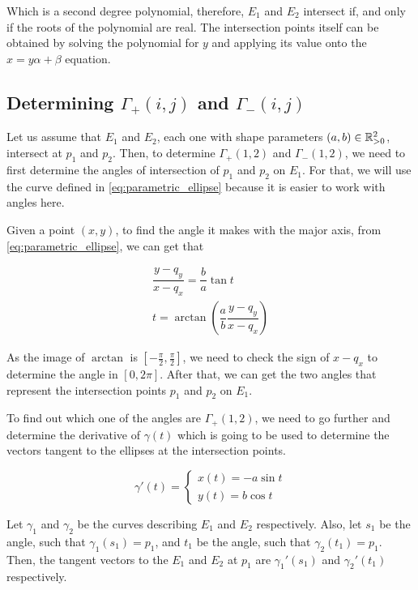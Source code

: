 Which is a second degree polynomial, therefore, $E_1$ and $E_2$ intersect if, and only if the roots of the polynomial are real. The intersection points itself can be obtained by solving the polynomial for $y$ and applying its value onto the $x=y\alpha + \beta$ equation.

\subsection{Determining $\Gamma_+(i,j)$ and $\Gamma_-(i,j)$}

Let us assume that $E_1$ and $E_2$, each one with shape parameters $(a,b) \in \mathbb{R}^2_{>0}$, intersect at $p_1$ and $p_2$. Then, to determine $\Gamma_+(1,2)$ and $\Gamma_-(1,2)$, we need to first determine the angles of intersection of $p_1$ and $p_2$ on $E_1$. For that, we will use the curve defined in \autoref{eq:parametric_ellipse} because it is easier to work with angles here.

Given a point $(x,y)$, to find the angle it makes with the major axis, from \autoref{eq:parametric_ellipse}, we can get that

\begin{align*}
\dfrac{y-q_y}{x-q_x} = \dfrac{b}{a}\tan{t}\\
t=\arctan\left(\dfrac{a}{b} \dfrac{y-q_y}{x-q_x}\right)
\end{align*}

As the image of $\arctan$ is $[-\frac{\pi}{2}, \frac{\pi}{2}]$, we need to check the sign of $x-q_x$ to determine the angle in $[0, 2\pi]$. After that, we can get the two angles that represent the intersection points $p_1$ and $p_2$ on $E_1$.

To find out which one of the angles are $\Gamma_+(1,2)$, we need to go further and determine the derivative of $\gamma(t)$ which is going to be used to determine the vectors tangent to the ellipses at the intersection points.

\begin{equation}\label{eq:der_parametric_ellipse}
\gamma'(t) = \left\{
\begin{array}{l}
x(t)= -a\sin{t}\\
y(t)=b\cos{t}
\end{array}
\right.
\end{equation}

Let $\gamma_1$ and $\gamma_2$ be the curves describing $E_1$ and $E_2$ respectively. Also, let $s_1$ be the angle, such that $\gamma_1(s_1)=p_1$, and $t_1$ be the angle, such that $\gamma_2(t_1)=p_1$.
Then, the tangent vectors to the $E_1$ and $E_2$ at $p_1$ are $\gamma_1'(s_1)$ and $\gamma_2'(t_1)$ respectively.

